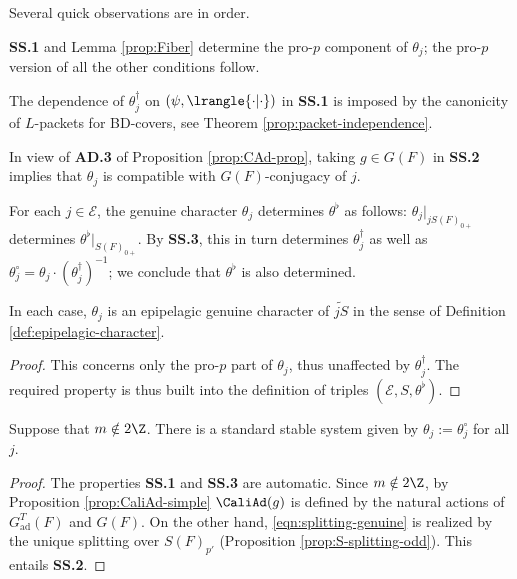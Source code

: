 \documentclass[a4paper,10pt]{article}
\begin{document}
Several quick observations are in order.
\begin{compactitem}
	\item \textbf{SS.1} and Lemma \ref{prop:Fiber} determine the pro-$p$ component of $\theta_j$; the pro-$p$ version of all the other conditions follow.
	\item The dependence of $\theta_j^\dagger$ on $(\psi, \lrangle{\cdot|\cdot})$ in \textbf{SS.1} is imposed by the canonicity of $L$-packets for BD-covers, see Theorem \ref{prop:packet-independence}.
	\item In view of \textbf{AD.3} of Proposition \ref{prop:CAd-prop}, taking $g \in G(F)$ in \textbf{SS.2} implies that $\theta_j$ is compatible with $G(F)$-conjugacy of $j$.
	\item For each $j \in \mathcal{E}$, the genuine character $\theta_j$ determines $\theta^\flat$ as follows: $\theta_j|_{jS(F)_{0+}}$ determines $\theta^\flat|_{S(F)_{0+}}$. By \textbf{SS.3}, this in turn determines $\theta_j^\dagger$ as well as $\theta_j^\circ = \theta_j \cdot  (\theta_j^\dagger)^{-1}$; we conclude that $\theta^\flat$ is also determined.
\end{compactitem}

\begin{lemma}
	In each case, $\theta_j$ is an epipelagic genuine character of $\widetilde{jS}$ in the sense of Definition \ref{def:epipelagic-character}.
\end{lemma}
\begin{proof}
	This concerns only the pro-$p$ part of $\theta_j$, thus unaffected by $\theta_j^\dagger$. The required property is thus built into the definition of triples $(\mathcal{E}, S, \theta^\flat)$.
\end{proof}

\begin{proposition}\label{prop:std-stable-system}
	Suppose that $m \notin 2\Z$. There is a standard stable system given by $\theta_j := \theta_j^\circ$ for all $j$.
\end{proposition}
\begin{proof}
	The properties \textbf{SS.1} and \textbf{SS.3} are automatic. Since $m \notin 2\Z$, by Proposition \ref{prop:CaliAd-simple} $\CaliAd(g)$ is defined by the natural actions of $G^T_\text{ad}(F)$ and $G(F)$. On the other hand, \eqref{eqn:splitting-genuine} is realized by the unique splitting over $S(F)_{p'}$ (Proposition \ref{prop:S-splitting-odd}). This entails \textbf{SS.2}.
\end{proof}
\end{document}
